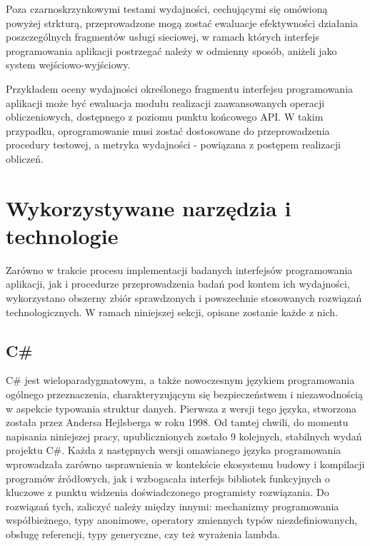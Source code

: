 Poza czarnoskrzynkowymi testami wydajności, cechującymi się omówioną powyżej strkturą, przeprowadzone mogą zostać ewaluacje efektywności działania poszczególnych fragmentów usługi sieciowej, w ramach których interfejs programowania aplikacji postrzegać należy w odmienny sposób, aniżeli jako system wejściowo-wyjściowy.

Przykładem oceny wydajności określonego fragmentu interfejsu programowania aplikacji może być ewaluacja modułu realizacji zaawansowanych operacji obliczeniowych, dostępnego z poziomu punktu końcowego API. W takim przypadku, oprogramowanie musi zostać dostosowane do przeprowadzenia procedury testowej, a metryka wydajności - powiązana z postępem realizacji obliczeń.
\section{Wykorzystywane narzędzia i technologie}
Zarówno w trakcie procesu implementacji badanych interfejsów programowania aplikacji, jak i procedurze przeprowadzenia badań pod kontem ich wydajności, wykorzystano obszerny zbiór sprawdzonych i powszechnie stosowanych rozwiązań technologicznych. W ramach niniejszej sekcji, opisane zostanie każde z nich.

\subsection*{C\#}
C\# jest wieloparadygmatowym, a także nowoczesnym językiem programowania ogólnego przeznaczenia, charakteryzującym się bezpieczeństwem i niezawodnością w aspekcie typowania struktur danych. Pierwsza z wersji tego języka, stworzona została przez Andersa Hejlsberga w roku 1998. Od tamtej chwili, do momentu napisania niniejszej pracy, upublicznionych zostało 9 kolejnych,  stabilnych wydań projektu C\#. Każda z następnych wersji omawianego języka programowania wprowadzała zarówno usprawnienia w kontekście ekosystemu budowy i kompilacji programów źródłowych, jak i wzbogacała interfejs bibliotek funkcyjnych o kluczowe z punktu widzenia doświadczonego programisty rozwiązania. Do rozwiązań tych, zaliczyć należy między innymi: mechanizmy programowania współbieżnego, typy anonimowe, operatory zmiennych typów niezdefiniowanych, obsługę referencji, typy generyczne, czy też wyrażenia lambda. 

